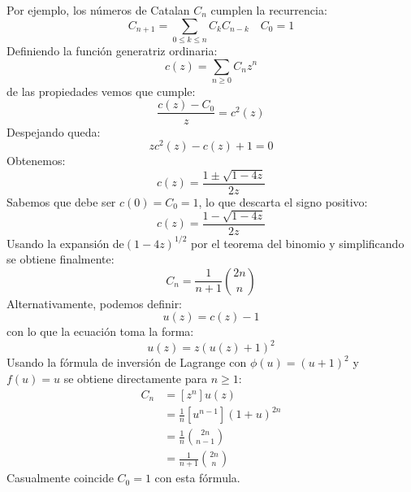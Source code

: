   Por ejemplo,
  los números de Catalan \(C_n\) cumplen la recurrencia:
  \begin{equation*}
    C_{n + 1}
      = \sum_{0 \le k \le n} C_k C_{n - k}
      \quad C_0 = 1
  \end{equation*}
  Definiendo la función generatriz ordinaria:
  \begin{equation*}
    c(z)
      = \sum_{n \ge 0} C_n z^n
  \end{equation*}
  de las propiedades vemos que cumple:
  \begin{equation*}
    \frac{c(z) - C_0}{z}
      = c^2(z)
  \end{equation*}
  Despejando queda:
  \begin{equation*}
    z c^2(z) - c(z) + 1
      = 0
  \end{equation*}
  Obtenemos:
  \begin{equation*}
    c(z)
      = \frac{1 \pm \sqrt{1 - 4 z}}{2 z}
  \end{equation*}
  Sabemos que debe ser \(c(0) = C_0 = 1\),
  lo que descarta el signo positivo:
  \begin{equation*}
    c(z)
      = \frac{1 - \sqrt{1 - 4 z}}{2 z}
  \end{equation*}
  Usando la expansión de\((1 - 4 z)^{1/2}\)
  por el teorema del binomio y simplificando
  se obtiene finalmente:
  \begin{equation*}
    C_n
      = \frac{1}{n + 1} \binom{2 n}{n}
  \end{equation*}
  Alternativamente,
  podemos definir:
  \begin{equation*}
    u(z)
      = c(z) - 1
  \end{equation*}
  con lo que la ecuación toma la forma:
  \begin{equation*}
    u(z)
      = z (u(z) + 1)^2
  \end{equation*}
  Usando la fórmula de inversión de Lagrange con \(\phi(u) = (u + 1)^2\)
  y \(f(u) = u\) se obtiene directamente para \(n \ge 1\):
  \begin{align*}
    C_n
      &= [z^n] u(z) \\
      &= \frac{1}{n} [u^{n - 1}] (1 + u)^{2 n} \\
      &= \frac{1}{n} \binom{2 n}{n - 1} \\
      &= \frac{1}{n + 1} \binom{2 n}{n}
  \end{align*}
  Casualmente coincide \(C_0 = 1\) con esta fórmula.

